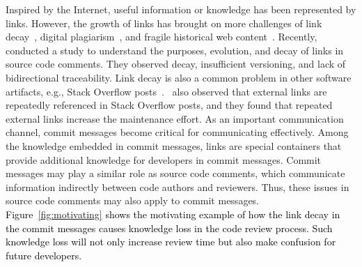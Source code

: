 \documentclass[smallextended]{svjour3}       %
\newcommand{\fix}[1]{\textcolor{black}{#1}}
\begin{document}
Inspired by the Internet, useful information or knowledge has been represented by links. 
However, the growth of links has brought on more challenges of link decay~\citep{kehoe1998gvu}, digital plagiarism~\citep{barrie2000digital}, and fragile historical \fix{w}eb content~\citep{murphy2007take}.
Recently,~\cite{hata20199} conducted a study to understand the purposes, evolution, and decay of links in source code comments.
They observed decay, insufficient versioning, and lack of bidirectional traceability. 
Link decay is also a common problem in other software artifacts, e.g., Stack Overflow posts~\citep{liu2021broken}.~\cite{liu2022exploratory} also observed that external links are repeatedly referenced in Stack Overflow posts, and they found that repeated external links increase the maintenance effort.
As an important communication channel, commit messages become critical for communicating effectively. Among the knowledge embedded in commit messages, links are special containers that provide additional knowledge for developers in commit messages. Commit messages may play a similar role as source code comments, which communicate information indirectly between code authors and reviewers. Thus, these issues in source code comments may also apply to commit messages. \fix{Figure~\ref{fig:motivating} shows the motivating example of how the link decay in the commit messages causes knowledge loss in the code review process. Such knowledge loss will not only increase review time but also make confusion for future developers.} 
\end{document}
